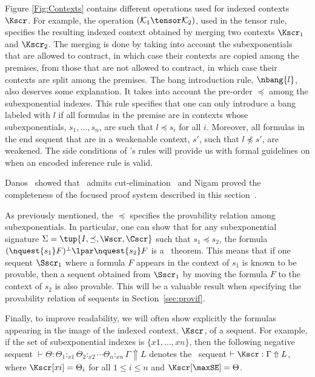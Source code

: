 Figure \ref{Fig:Contexts} contains different
operations used for indexed contexts $\Kscr$. For example, the
operation 
$(\mathcal{K}_1 \tensor \mathcal{K}_2)$, used in the tensor rule, 
specifies the resulting indexed context obtained by merging two contexts
$\Kscr_1$ and $\Kscr_2$. The merging is done by taking into account the
subexponentials that are allowed to contract, in which case their contexts
are copied among the premises, from those that are not allowed
to contract, in which case their contexts are split among the premises. 
The bang introduction rule, $\nbang{l}$, also deserves some explanation.
It takes into account the pre-order $\preceq$ among the subexponential
indexes. This rule specifies that one can only introduce a bang labeled
with $l$ if all formulas in the premise are in contexts whose
subexponentials, $s_1, \ldots, s_n$, are such that $l \preceq s_i$ for all
$i$. Moreover, all formulas in the end sequent that are
in a weakenable context, $s'$, such that $l \npreceq
s'$, are weakened.
The side conditions of \sellf's rules will
provide us with formal guidelines on when an encoded inference rule is
valid. 

Danos \etal\ showed that \sellf\ admits cut-elimination~\cite{danos93kgc}
and Nigam proved the completeness of the focused proof system described in
this section~\cite{nigam09phd}. 

As previously mentioned, the $\preceq$ specifies the provability
relation among subexponentials. In particular, one
can show that for any subexponential signature $\Sigma = \tup{I, \preceq,
\Wscr, \Cscr}$ such that $s_1 \preceq s_2$, the formula $(\nquest{s_1}
F)^\bot \lpar \nquest{s_2} F$ is a \sellf\ theorem. This means that if one
sequent $\Sscr_1$ where a formula $F$ appears in
the context of $s_1$ is known to be provable, then a sequent obtained from
$\Sscr_1$ by moving the formula $F$ to the context of $s_2$ is also
provable. This will be a valuable result when specifying the provability
relation of sequents in Section~\ref{sec:provif}.

Finally, to improve readability, we will often show explicitly the 
formulas appearing in the image of the indexed
context, $\Kscr$, of a sequent. For example, if the set of subexponential
indexes is $\{x1, \ldots, xn \}$, then the following negative sequent 
$ \vdash \Theta : \Theta_1 :_{x1} \Theta_2 :_{x2} \cdots \Theta_n :_{xn}
\Gamma
\Uparrow L$
denotes the \SELLF\ sequent $\vdash \Kscr: \Gamma \Uparrow L$, where
$\Kscr[xi] = \Theta_i$ for all $1 \leq i \leq n$ and $\Kscr[\maxSE] =
\Theta$.


